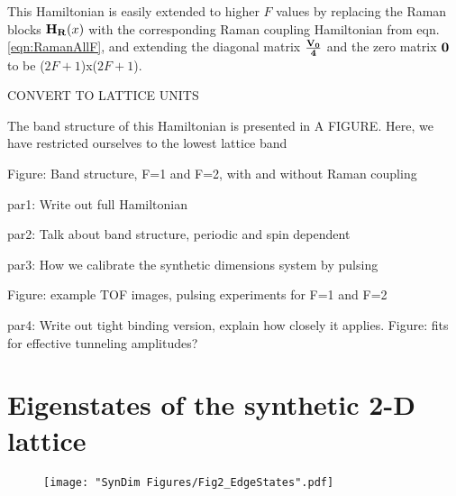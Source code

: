 This Hamiltonian is easily extended to higher $F$ values by replacing the Raman blocks ${\bf H_R}(x)$ with the corresponding Raman coupling Hamiltonian from eqn. \ref{eqn:RamanAllF}, and extending the diagonal matrix  ${\bf \frac{V_0}{4}}$ and the zero matrix $\bf 0$ to be ($2F+1$)x($2F+1$).

CONVERT TO LATTICE UNITS

The band structure of this Hamiltonian is presented in A FIGURE. Here, we have restricted ourselves to the lowest lattice band 

Figure: Band structure, F=1 and F=2, with and without Raman coupling

par1: Write out full Hamiltonian

par2: Talk about band structure, periodic and spin dependent 

par3: How we calibrate the synthetic dimensions system by pulsing

Figure: example TOF images, pulsing experiments for F=1 and F=2

par4: Write out tight binding version, explain how closely it applies. Figure: fits for effective tunneling amplitudes?

\section{Eigenstates of the synthetic 2-D lattice}

\begin{figure}
	\texttt{[image: "SynDim Figures/Fig2\_EdgeStates".pdf]}
\caption{}
\label{fig:TOFeigenstates}
\end{figure}

